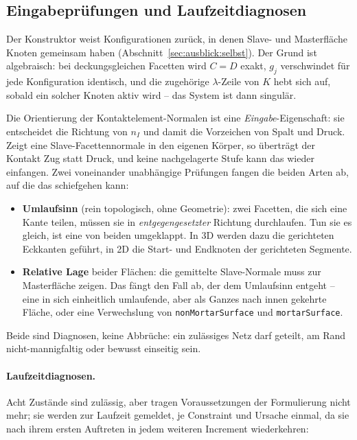 \documentclass[a4paper,11pt]{article}
\def\bm#1{#1}%
\def\tilde#1{#1}%
\newcommand{\code}[1]{\texttt{\small #1}}
\begin{document}
\subsection{Eingabeprüfungen und Laufzeitdiagnosen}
Der Konstruktor weist Konfigurationen zurück, in denen Slave- und Masterfläche Knoten gemeinsam
haben (Abschnitt~\ref{sec:ausblick:selbst}). Der Grund ist algebraisch: bei deckungsgleichen
Facetten wird $\bm C=\bm D$ exakt, $\tilde g_j$ verschwindet für jede Konfiguration identisch, und
die zugehörige $\lambda$-Zeile von $\bm K$ hebt sich auf, sobald ein solcher Knoten aktiv wird --
das System ist dann singulär.

Die Orientierung der Kontaktelement-Normalen ist eine \emph{Eingabe}-Eigenschaft: sie entscheidet
die Richtung von $\bm n_I$ und damit die Vorzeichen von Spalt und Druck. Zeigt eine
Slave-Facettennormale in den eigenen Körper, so überträgt der Kontakt Zug statt Druck, und keine
nachgelagerte Stufe kann das wieder einfangen. Zwei voneinander unabhängige Prüfungen fangen die
beiden Arten ab, auf die das schiefgehen kann:

\begin{itemize}\itemsep2pt
  \item \textbf{Umlaufsinn} (rein topologisch, ohne Geometrie): zwei Facetten, die sich eine Kante
        teilen, müssen sie in \emph{entgegengesetzter} Richtung durchlaufen. Tun sie es gleich, ist
        eine von beiden umgeklappt. In 3D werden dazu die gerichteten Eckkanten geführt, in 2D die
        Start- und Endknoten der gerichteten Segmente.
  \item \textbf{Relative Lage} beider Flächen: die gemittelte Slave-Normale muss zur Masterfläche
        zeigen. Das fängt den Fall ab, der dem Umlaufsinn entgeht -- eine in sich einheitlich
        umlaufende, aber als Ganzes nach innen gekehrte Fläche, oder eine Verwechslung von
        \code{nonMortarSurface} und \code{mortarSurface}.
\end{itemize}

\noindent Beide sind Diagnosen, keine Abbrüche: ein zulässiges Netz darf geteilt, am Rand
nicht-mannigfaltig oder bewusst einseitig sein.

\paragraph{Laufzeitdiagnosen.}
Acht Zustände sind zulässig, aber tragen Voraussetzungen der Formulierung nicht mehr; sie werden
zur Laufzeit gemeldet, je Constraint und Ursache einmal, da sie nach ihrem ersten Auftreten in
jedem weiteren Increment wiederkehren:
\end{document}
